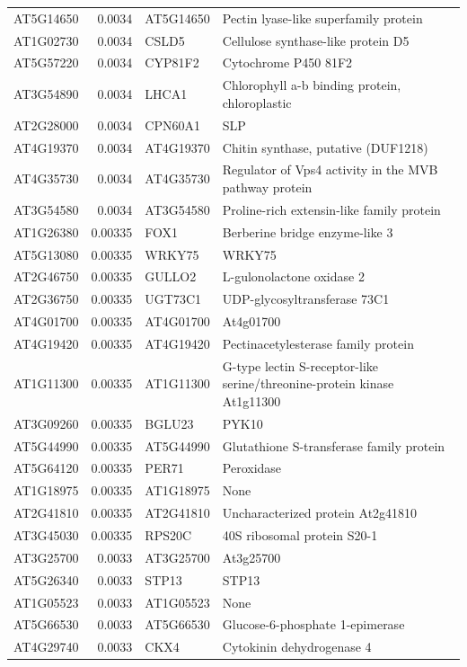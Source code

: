 \documentclass[11pt]{article}
\begin{document}
\begin{center}
\begin{tabular}{lrll}
AT5G14650 & 0.0034 & AT5G14650 & Pectin lyase-like superfamily protein\\
AT1G02730 & 0.0034 & CSLD5 & Cellulose synthase-like protein D5\\
AT5G57220 & 0.0034 & CYP81F2 & Cytochrome P450 81F2\\
AT3G54890 & 0.0034 & LHCA1 & Chlorophyll a-b binding protein, chloroplastic\\
AT2G28000 & 0.0034 & CPN60A1 & SLP\\
AT4G19370 & 0.0034 & AT4G19370 & Chitin synthase, putative (DUF1218)\\
AT4G35730 & 0.0034 & AT4G35730 & Regulator of Vps4 activity in the MVB pathway protein\\
AT3G54580 & 0.0034 & AT3G54580 & Proline-rich extensin-like family protein\\
AT1G26380 & 0.00335 & FOX1 & Berberine bridge enzyme-like 3\\
AT5G13080 & 0.00335 & WRKY75 & WRKY75\\
AT2G46750 & 0.00335 & GULLO2 & L-gulonolactone oxidase 2\\
AT2G36750 & 0.00335 & UGT73C1 & UDP-glycosyltransferase 73C1\\
AT4G01700 & 0.00335 & AT4G01700 & At4g01700\\
AT4G19420 & 0.00335 & AT4G19420 & Pectinacetylesterase family protein\\
AT1G11300 & 0.00335 & AT1G11300 & G-type lectin S-receptor-like serine/threonine-protein kinase At1g11300\\
AT3G09260 & 0.00335 & BGLU23 & PYK10\\
AT5G44990 & 0.00335 & AT5G44990 & Glutathione S-transferase family protein\\
AT5G64120 & 0.00335 & PER71 & Peroxidase\\
AT1G18975 & 0.00335 & AT1G18975 & None\\
AT2G41810 & 0.00335 & AT2G41810 & Uncharacterized protein At2g41810\\
AT3G45030 & 0.00335 & RPS20C & 40S ribosomal protein S20-1\\
AT3G25700 & 0.0033 & AT3G25700 & At3g25700\\
AT5G26340 & 0.0033 & STP13 & STP13\\
AT1G05523 & 0.0033 & AT1G05523 & None\\
AT5G66530 & 0.0033 & AT5G66530 & Glucose-6-phosphate 1-epimerase\\
AT4G29740 & 0.0033 & CKX4 & Cytokinin dehydrogenase 4\\

\end{tabular}
\end{center}
\end{document}
